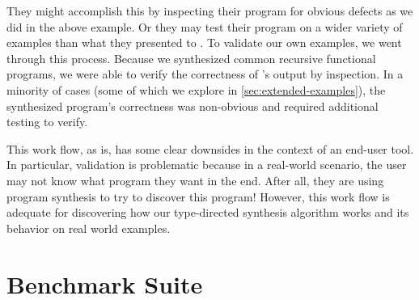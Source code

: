 They might accomplish this by inspecting their program for obvious defects as we did in the above example.
Or they may test their program on a wider variety of examples than what they presented to \myth{}.
To validate our own examples, we went through this process.
Because we synthesized common recursive functional programs, we were able to verify the correctness of \myth{}'s output by inspection.
In a minority of cases (some of which we explore in \autoref{sec:extended-examples}), the synthesized program's correctness was non-obvious and required additional testing to verify.

This work flow, as is, has some clear downsides in the context of an end-user tool.
In particular, validation is problematic because in a real-world scenario, the user may not know what program they want in the end.
After all, they are using program synthesis to try to discover this program!
However, this work flow is adequate for discovering how our type-directed synthesis algorithm works and its behavior on real world examples.

\section{Benchmark Suite}
\label{sec:benchmark-suite}


